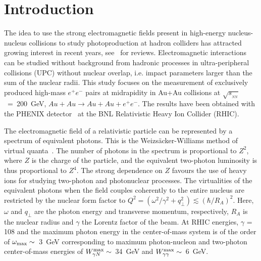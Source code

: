 \documentclass[dvipdfm]{elsart}
\newcommand{\sqrtsnn}{\sqrt{s_{_{NN}}}}
\begin{document}

\section{Introduction}
\label{section:introduction}

\setcounter{section}{1}\setcounter{equation}{0}

The idea to use the strong electromagnetic fields present in high-energy 
nucleus-nucleus collisions to study photoproduction at hadron colliders has 
attracted growing interest in recent years, 
see~\cite{Baur:2001jj,Bertulani:2005ru,Baltz:2007kq} for reviews. 
Electromagnetic interactions can be studied without background from hadronic 
processes in ultra-peripheral collisions (UPC) without nuclear overlap, i.e. impact 
parameters larger than the sum of the nuclear radii. This study focuses on 
the measurement of exclusively produced high-mass $e^+ e^-$ pairs at 
midrapidity in Au+Au collisions at $\sqrtsnn$~=~200~GeV, $Au+Au \rightarrow 
Au+Au + e^+ e^-$. The results have been obtained with the PHENIX 
detector~\cite{Adcox:2003zm} at the BNL Relativistic Heavy Ion Collider 
(RHIC).

The electromagnetic field of a relativistic particle can be represented by a 
spectrum of equivalent photons. This is the Weizs{\"a}cker-Williams method of 
virtual quanta~\cite{vonWeizsacker:1934sx,Williams:1934ad}. The number of 
photons in the spectrum is proportional to $Z^2$, where $Z$ is the charge of 
the particle, and the equivalent two-photon luminosity is thus proportional 
to $Z^4$. The strong dependence on $Z$ favours the use of heavy ions for 
studying two-photon and photonuclear processes. The virtualities of the 
equivalent photons when the field couples coherently to the entire nucleus 
are restricted by the nuclear form factor to 
$Q^2=\left(\omega^2/\gamma^2+q_\perp^2\right)\lesssim (\hbar/R_A)^2$. Here, 
$\omega$ and $q_\perp$ are the photon energy and transverse momentum, 
respectively, $R_A$ is the nuclear radius and $\gamma$ the Lorentz factor of 
the beam. At RHIC energies, $\gamma$ = 108 and the maximum photon energy in 
the center-of-mass system is of the order of $\omega_{\rm max}\sim$~3~GeV 
corresponding to maximum photon-nucleon and two-photon center-of-mass 
energies of $W^{\rm max}_{\gamma N} \sim$~34~GeV and $W^{\rm max}_{\gamma \gamma} 
\sim$~6~GeV.
\end{document}
